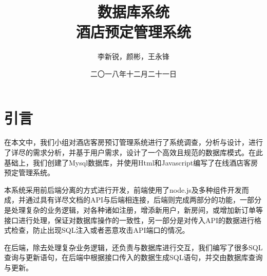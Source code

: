 \documentclass{myreport}
\begin{document}
\title{数据库系统 \\ 酒店预定管理系统}
\author{李新锐，颜彬，王永锋}                            %
\date{二〇一八年十二月二十一日}                %
\maketitle
\frontmatter
\tableofcontents
\mainmatter 


\chapter{引言}

在本文中，我们小组对酒店客房预订管理系统进行了系统调查，分析与设计，进行了详尽的需求分析，并基于用户需求，设计了一个高效且规范的数据库模式。在此基础上，我们创建了Mysql数据库，并使用Html和Javascript编写了在线酒店客房预定管理系统。

本系统采用前后端分离的方式进行开发，前端使用了node.js及多种组件开发而成，并通过具有详尽文档的API与后端相连接，后端则完成两部分的功能，一部分是处理复杂的业务逻辑，对各种诸如注册，增添新用户，新房间，或增加新订单等接口进行处理，保证对数据库操作的一致性，另一部分是对传入API的数据进行格式检查，防止出现SQL注入或者恶意攻击API端口的情况。

在后端，除去处理复杂业务逻辑，还负责与数据库进行交互，我们编写了很多SQL查询与更新语句，在后端中根据接口传入的数据生成SQL语句，并交由数据库查询与更新。
\end{document}
